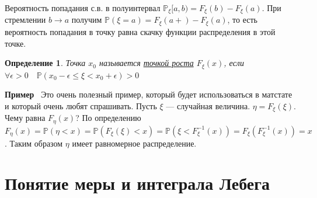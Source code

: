 \documentclass[12pt]{article}
\newtheorem{Def}{Определение}
\newenvironment{Ex}{{\bf Пример}\ }{}
\numberwithin{Th}{section}
\numberwithin{Def}{section}
\numberwithin{Lem}{section}
\numberwithin{St}{section}
\numberwithin{equation}{section}
\newcommand\Pro{\mathbb{P}}
\begin{document}
Вероятность попадания с.в. в полуинтервал $\Pro_\xi[a,b) = F_\xi(b) - F_\xi(a)$. При стремлении $b \to a$ получим $\Pro(\xi = a) = F_\xi(a+) - F_\xi(a)$, то есть 
вероятность попадания в точку равна скачку функции распределения в этой точке.

\begin{Def}
Точка $x_0$ называется \underline{точкой роста} $F_\xi(x)$, если $\forall \epsilon > 0 \quad \Pro(x_0 - \epsilon \le \xi < x_0 + \epsilon) > 0$
\end{Def}
\begin{Ex}
Это очень полезный пример, который будет использоваться в матстате и который очень любят спрашивать. Пусть $\xi$ --- случайная величина. $\eta = F_\xi(\xi)$. Чему равна
$F_\eta(x)$? По определению $F_\eta(x) = \Pro(\eta < x) = \Pro(F_\xi(\xi) < x)=\Pro(\xi < F_\xi^{-1}(x)) = F_\xi(F_\xi^{-1}(x))=x$. Таким образом $\eta$ имеет равномерное распределение.
\end{Ex}

\newpage

\section{Понятие меры и интеграла Лебега}
\end{document}
